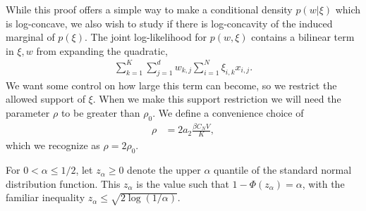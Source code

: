 \documentclass{article}
\numberwithin{equation}{section}
\theoremstyle{Lemma}
\theoremstyle{Corollary}
\theoremstyle{Theorem}
\theoremstyle{Remark}
\begin{document}

While this proof offers a simple way to make a conditional density $p(w|\xi)$ which is log-concave, we also wish to study if there is log-concavity of the induced marginal of $p(\xi)$. The joint log-likelihood for $p(w, \xi)$ contains a bilinear term in $\xi, w$ from expanding the quadratic,
\begin{align}
\sum_{k=1}^{K}\sum_{j=1}^{d}w_{k,j}\sum_{i=1}^{N}\xi_{i,k}x_{i,j}\label{bilinear_term}.
\end{align}
We want some control on how large this term can become, so we restrict the allowed support of $\xi$. When we make this support restriction we will need the parameter $\rho$ to be greater than $\rho_0$.
We define a convenience choice of 
\begin{align}
    \rho&= 2 a_{2}\frac{\beta C_{N} V}{K},\label{larger_rho_def}
\end{align}
which we recognize as $\rho=2 \rho_0$.  

For $0<\alpha \le 1/2$, let $z_\alpha\ge 0$ denote the upper $\alpha$ quantile of the standard normal distribution function. This $z_\alpha$ is the value such that $1-\Phi(z_\alpha) = \alpha$, with the familiar inequality $z_\alpha \le \sqrt{2 \log(1/\alpha)}$. 
\end{document}
